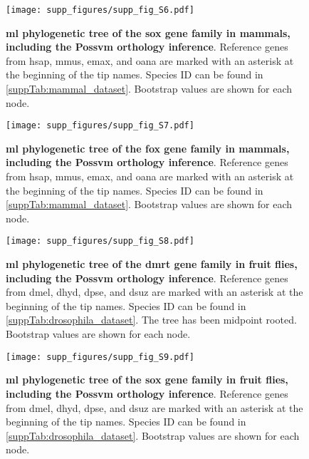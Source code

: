 \begin{figure}[ht]
	\centering
	\texttt{[image: supp\_figures/supp\_fig\_S6.pdf]}
	\caption[\textbf{\gls{ml} phylogenetic tree of the \gls{sox} gene family in mammals, including the Possvm orthology inference}]
	{
		\textbf{\gls{ml} phylogenetic tree of the \gls{sox} gene family in mammals, including the Possvm orthology inference}. Reference genes from \gls{hsap}, \gls{mmus}, \gls{emax}, and \gls{oana} are marked with an asterisk at the beginning of the tip names. Species ID can be found in \cref{suppTab:mammal_dataset}. Bootstrap values are shown for each node.
	}
	\label{suppFig:sox_mammals}
\end{figure}

\begin{figure}[ht]
	\centering
	\texttt{[image: supp\_figures/supp\_fig\_S7.pdf]}
	\caption[\textbf{\gls{ml} phylogenetic tree of the \gls{fox} gene family in mammals, including the Possvm orthology inference}]
	{
		\textbf{\gls{ml} phylogenetic tree of the \gls{fox} gene family in mammals, including the Possvm orthology inference}. Reference genes from \gls{hsap}, \gls{mmus}, \gls{emax}, and \gls{oana} are marked with an asterisk at the beginning of the tip names. Species ID can be found in \cref{suppTab:mammal_dataset}. Bootstrap values are shown for each node.
	}
	\label{suppFig:fox_mammals}
\end{figure}

\begin{figure}[ht]
	\centering
	\texttt{[image: supp\_figures/supp\_fig\_S8.pdf]}
	\caption[\textbf{\gls{ml} phylogenetic tree of the \gls{dmrt} gene family in fruit flies, including the Possvm orthology inference}]
	{
		\textbf{\gls{ml} phylogenetic tree of the \gls{dmrt} gene family in fruit flies, including the Possvm orthology inference}. Reference genes from \gls{dmel}, \gls{dhyd}, \gls{dpse}, and \gls{dsuz} are marked with an asterisk at the beginning of the tip names. Species ID can be found in \cref{suppTab:drosophila_dataset}. The tree has been midpoint rooted. Bootstrap values are shown for each node.
	}
	\label{suppFig:dmrt_drosophila}
\end{figure}

\begin{figure}[ht]
	\centering
	\texttt{[image: supp\_figures/supp\_fig\_S9.pdf]}
	\caption[\textbf{\gls{ml} phylogenetic tree of the \gls{sox} gene family in fruit flies, including the Possvm orthology inference}]
	{
		\textbf{\gls{ml} phylogenetic tree of the \gls{sox} gene family in fruit flies, including the Possvm orthology inference}. Reference genes from \gls{dmel}, \gls{dhyd}, \gls{dpse}, and \gls{dsuz} are marked with an asterisk at the beginning of the tip names. Species ID can be found in \cref{suppTab:drosophila_dataset}. Bootstrap values are shown for each node.
	}
	\label{suppFig:sox_drosophila}
\end{figure}

